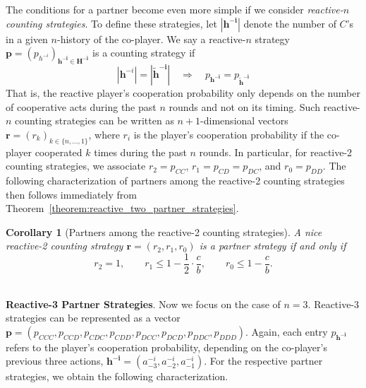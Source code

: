 \documentclass[11pt]{article}
\theoremstyle{plainCl1}
\newtheorem{corollary}{Corollary}
\theoremstyle{plainCl2}
\begin{document}
The conditions for a partner become even more simple if we consider {\it reactive-$n$ counting strategies}. To define these strategies, let $|\mathbf{h^{-i}}|$ denote the number of $C$'s in a given $n$-history of the co-player. We say a reactive-$n$ strategy $\mathbf{p}\!=\!(p_{h^{-i}})_{\mathbf{h^{-i}\in H^{-i}}}$ is a counting strategy if 
\begin{equation}
|\mathbf{h}^{-i}|\! =\! |\mathbf{\tilde h^{-i}}| \quad \Rightarrow \quad p_\mathbf{h^{-i}} = p_\mathbf{\tilde h^{-i}}
\end{equation} 
That is, the reactive player's cooperation probability only depends on the number of cooperative acts during the past $n$ rounds and not on its timing. 
Such reactive-$n$ counting strategies can be written as $n\!+\!1$-dimensional vectors $\mathbf{r}\!=\!(r_k)_{k\in\{n,\ldots,1\}}$, where $r_i$ is the player's cooperation probability if the co-player cooperated $k$ times during the past $n$ rounds. In particular, for reactive-2 counting strategies, we associate $r_2\!=\!p_{CC}$, $r_1\!=\!p_{CD}\!=\!p_{DC}$, and $r_0\!=\!p_{DD}$. 
The following characterization of partners among the reactive-2 counting strategies then follows immediately from Theorem~\ref{theorem:reactive_two_partner_strategies}. 

\begin{corollary}[Partners among the reactive-2 counting strategies]
\label{Cor:PartnersCountingTwo} 
A nice reactive-2 counting strategy $\mathbf{r} = (r_2, r_1, r_0)$ is a partner strategy if and only if
\begin{equation}\label{eq:counting_two_bit_conditions}
 r_2 \!=\! 1, \qquad r_1 \!\le\! 1\!-\!\frac{1}{2} \cdot \frac{c}{b}, \qquad r_0 \!\le\! 1\!-\! \frac{c}{b}.
\end{equation}
\end{corollary}
 ~\\


\noindent
{\bf Reactive-3 Partner Strategies}.
Now we focus on the case of $n=3$. Reactive-3 strategies can be represented as a vector 
$\mathbf{p}=(p_{CCC}, p_{CCD}, p_{CDC}, p_{CDD}, p_{DCC}, p_{DCD}, p_{DDC}, p_{DDD})$.
Again, each entry $p_\mathbf{h^{-i}}$ refers to the player's cooperation probability, depending on the co-player's previous three actions, $\mathbf{h^{-i}}\!=\!(a^{-i}_{-3}, a^{-i}_{-2}, a^{-i}_{-1})$.
For the respective partner strategies, we obtain the following characterization. 
\end{document}
